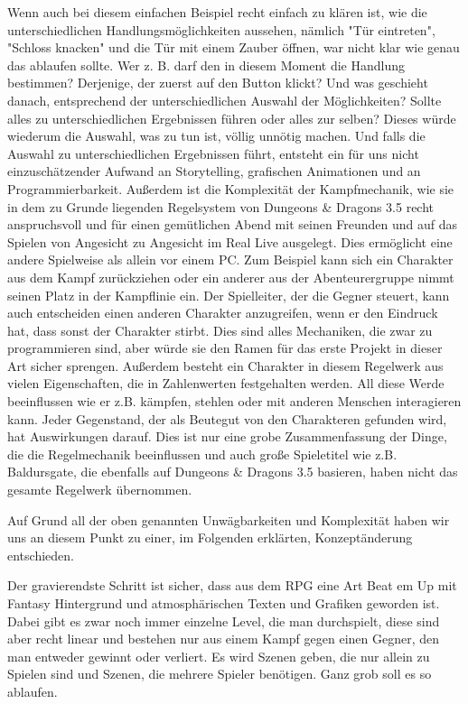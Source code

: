 Wenn auch bei diesem einfachen Beispiel recht einfach zu klären ist, wie die unterschiedlichen Handlungsmöglichkeiten aussehen, nämlich "Tür eintreten", "Schloss knacken" und die Tür mit einem Zauber öffnen, war nicht klar wie genau das ablaufen sollte. Wer z. B. darf den in diesem Moment die Handlung bestimmen? Derjenige, der zuerst auf den Button klickt? Und was geschieht danach, entsprechend der unterschiedlichen Auswahl der Möglichkeiten? Sollte alles zu unterschiedlichen Ergebnissen führen oder alles zur selben? Dieses würde wiederum die Auswahl, was zu tun ist, völlig unnötig machen. Und falls die Auswahl zu unterschiedlichen Ergebnissen führt, entsteht ein für uns nicht einzuschätzender Aufwand an Storytelling, grafischen Animationen und an Programmierbarkeit. Außerdem ist die Komplexität der Kampfmechanik, wie sie in dem zu Grunde liegenden Regelsystem von Dungeons \& Dragons 3.5 recht anspruchsvoll und für einen gemütlichen Abend mit seinen Freunden und auf das Spielen von Angesicht zu Angesicht im Real Live ausgelegt. Dies ermöglicht eine andere Spielweise als allein vor einem PC. Zum Beispiel kann sich ein Charakter aus dem Kampf zurückziehen oder ein anderer aus der Abenteurergruppe nimmt seinen Platz in der Kampflinie ein. Der Spielleiter, der die Gegner steuert, kann auch entscheiden einen anderen Charakter anzugreifen, wenn er den Eindruck hat, dass sonst der Charakter stirbt. Dies sind alles Mechaniken, die zwar zu programmieren sind, aber würde sie den Ramen für das erste Projekt in dieser Art sicher sprengen.
Außerdem besteht ein Charakter in diesem Regelwerk aus vielen Eigenschaften, die in Zahlenwerten festgehalten werden. All diese Werde beeinflussen wie er z.B. kämpfen, stehlen oder mit anderen Menschen interagieren kann. Jeder Gegenstand, der als Beutegut von den Charakteren gefunden wird, hat Auswirkungen darauf. Dies ist nur eine grobe Zusammenfassung der Dinge, die die Regelmechanik beeinflussen und auch große Spieletitel wie z.B. Baldursgate, die ebenfalls auf Dungeons \& Dragons 3.5 basieren, haben nicht das gesamte Regelwerk übernommen. 

Auf Grund all der oben genannten Unwägbarkeiten und Komplexität haben wir uns an diesem Punkt zu einer, im Folgenden erklärten, Konzeptänderung entschieden.

Der gravierendste Schritt ist sicher, dass aus dem RPG eine Art Beat em Up mit Fantasy Hintergrund und atmosphärischen Texten und Grafiken geworden ist. Dabei gibt es zwar noch immer einzelne Level, die man durchspielt, diese sind aber recht linear und bestehen nur aus einem Kampf gegen einen Gegner, den man entweder gewinnt oder verliert. Es wird Szenen geben, die nur allein zu Spielen sind und Szenen, die mehrere Spieler benötigen. Ganz grob soll es so ablaufen.

